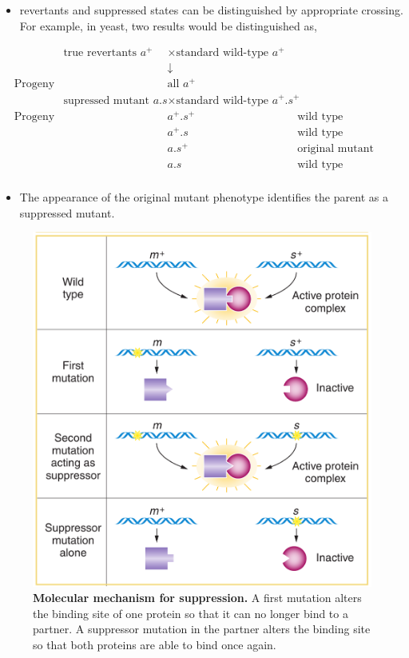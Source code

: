 \documentclass[11pt,dvipsnames,ignorenonframetext,aspectratio=169]{beamer}
\providecommand{\tightlist}{%
  \setlength{\itemsep}{0pt}\setlength{\parskip}{0pt}}
\begin{document}
\begin{frame}{}
\protect\hypertarget{section-23}{}

\begin{itemize}
\tightlist
\item
  revertants and suppressed states can be distinguished by appropriate
  crossing. For example, in yeast, two results would be distinguished
  as,
\end{itemize}

\[
\begin{aligned}
&& \textrm{true revertants }a^+ &\times \textrm{standard wild-type }a^+ & \\
&&& \downarrow & \\
& \textrm{Progeny} && \textrm{all } a^+ & \\
&& \textrm{supressed mutant } a.s &\times \textrm{standard wild-type } a^+.s^+ & \\
& \textrm{Progeny} && a^+. s^+ & \textrm{wild type} & \\
& && a^+. s & \textrm{wild type} & \\
& && a. s^+ & \textrm{original mutant} & \\
& && a. s & \textrm{wild type (supressed)} & \\
\end{aligned}
\]

\begin{itemize}
\tightlist
\item
  The appearance of the original mutant phenotype identifies the parent
  as a suppressed mutant.
\end{itemize}

\end{frame}

\begin{frame}{}
\protect\hypertarget{section-24}{}

\begin{figure}

{\centering \includegraphics[width=0.4\linewidth]{./../images/molecular_basis_suppression} 

}

\caption{\textbf{Molecular mechanism for suppression.} A first mutation alters the binding site of one protein so that it can no longer bind to a partner. A suppressor mutation in the partner alters the binding site so that both proteins are able to bind once again.}\label{fig:gene-suppression}
\end{figure}

\end{frame}
\end{document}
